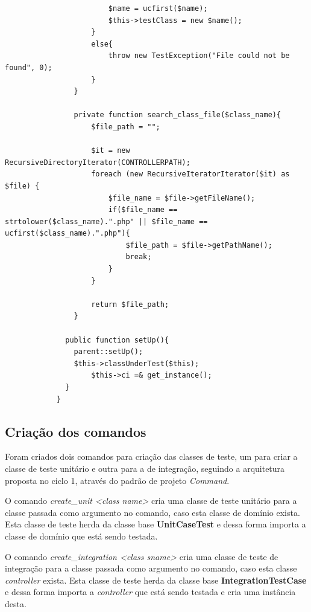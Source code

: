 \begin{lstlisting}
                        $name = ucfirst($name);
                        $this->testClass = new $name();
                    }
                    else{
                        throw new TestException("File could not be found", 0);
                    }
                }

                private function search_class_file($class_name){
                    $file_path = "";

                    $it = new RecursiveDirectoryIterator(CONTROLLERPATH);
                    foreach (new RecursiveIteratorIterator($it) as $file) {
                        $file_name = $file->getFileName();
                        if($file_name == strtolower($class_name).".php" || $file_name == ucfirst($class_name).".php"){
                            $file_path = $file->getPathName();
                            break; 
                        }
                    }

                    return $file_path;
                }

              public function setUp(){
                parent::setUp();
                $this->classUnderTest($this);
                    $this->ci =& get_instance();
              }
            }
    \end{lstlisting}


    \subsection{Criação dos comandos}

        Foram criados dois comandos para criação das classes de teste, um para criar a classe de teste unitário e outra para a de integração, seguindo a arquitetura 
        proposta no ciclo 1, através do padrão de projeto \textit{Command}. 

        O comando \textit{create\_unit <class name>} cria uma classe de teste unitário para a classe passada como argumento no comando, caso esta classe de domínio exista. Esta classe de teste herda da classe base \textbf{UnitCaseTest} e dessa forma importa a classe de domínio que está sendo testada.

        O comando \textit{create\_integration <class sname>} cria uma classe de teste de integração para a classe passada como argumento no comando, caso esta classe \textit{controller} exista. Esta classe de teste herda da classe base \textbf{IntegrationTestCase} e dessa forma importa a \textit{controller} que está sendo testada e cria uma instância desta.

